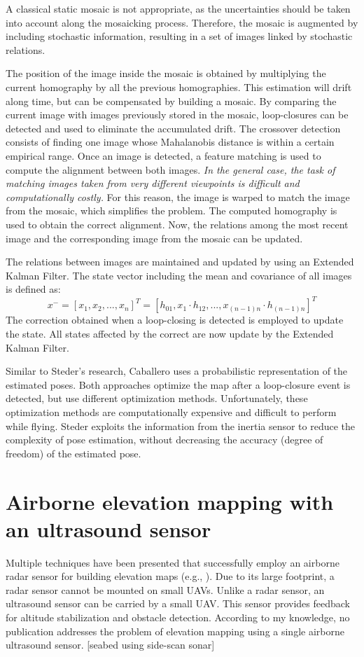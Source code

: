 A classical static mosaic is not appropriate, as the uncertainties should be taken into account along the mosaicking process.
Therefore, the mosaic is augmented by including stochastic information, resulting in a set of images linked by stochastic relations.

The position of the image inside the mosaic is obtained by multiplying the current homography by all the previous homographies.
This estimation will drift along time, but can be compensated by building a mosaic.
By comparing the current image with images previously stored in the mosaic, loop-closures can be detected and used to eliminate the accumulated drift.
The crossover detection consists of finding one image whose Mahalanobis distance is within a certain empirical range.
Once an image is detected, a feature matching is used to compute the alignment between both images. 
\textit{In the general case, the task of matching images taken from very different viewpoints is difficult and computationally costly.}
For this reason, the image is warped to match the image from the mosaic, which simplifies the problem.
The computed homography is used to obtain the correct alignment.
Now, the relations among the most recent image and the corresponding image from the mosaic can be updated.

The relations between images are maintained and updated by using an Extended Kalman Filter.
The state vector including the mean and covariance of all images is defined as:
\begin{equation}
x^{-} = [x_1, x_2, ..., x_n]^T = [h_{01}, x_1 \cdot h_{12}, ..., x_{(n-1)n} \cdot h_{(n-1)n}]^T
\end{equation}
The correction obtained when a loop-closing is detected is employed to update the state.
All states affected by the correct are now update by the Extended Kalman Filter.

Similar to Steder's research, Caballero uses a probabilistic representation of the estimated poses.
Both approaches optimize the map after a loop-closure event is detected, but use different optimization methods.
Unfortunately, these optimization methods are computationally expensive and difficult to perform while flying.
Steder exploits the information from the inertia sensor to reduce the complexity of pose estimation, without decreasing the accuracy (degree of freedom) of the estimated pose.



\section{Airborne elevation mapping with an ultrasound sensor}
Multiple techniques have been presented that successfully employ an airborne radar sensor for building elevation maps (e.g., \cite{foessel2000radar, weiß2006airborne}).
Due to its large footprint, a radar sensor cannot be mounted on small UAVs.
Unlike a radar sensor, an ultrasound sensor can be carried by a small UAV.
This sensor provides feedback for altitude stabilization and obstacle detection.
According to my knowledge, no publication addresses the problem of elevation mapping using a single airborne ultrasound sensor.
[seabed using side-scan sonar]



